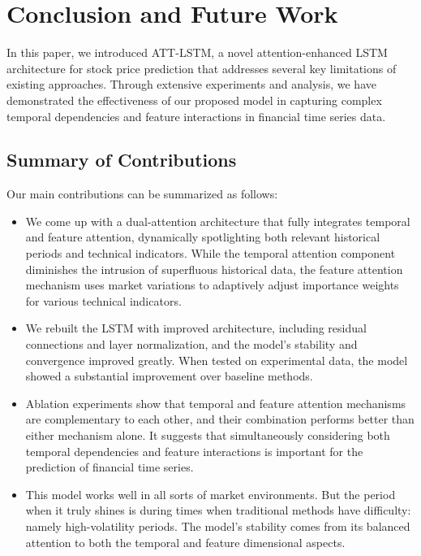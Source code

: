 \documentclass[10pt,twocolumn,letterpaper]{article}
\begin{document}
\section{Conclusion and Future Work}
In this paper, we introduced ATT-LSTM, a novel attention-enhanced LSTM architecture for stock price prediction that addresses several key limitations of existing approaches. Through extensive experiments and analysis, we have demonstrated the effectiveness of our proposed model in capturing complex temporal dependencies and feature interactions in financial time series data.
\subsection{Summary of Contributions}
Our main contributions can be summarized as follows:
\begin{itemize}
	\item We come up with a dual-attention architecture that fully integrates temporal and feature attention, dynamically spotlighting both relevant historical periods and technical indicators. While the temporal attention component diminishes the intrusion of superfluous historical data, the feature attention mechanism uses market variations to adaptively adjust importance weights for various technical indicators.
	
	\item We rebuilt the LSTM with improved architecture, including residual connections and layer normalization, and the model's stability and convergence improved greatly. When tested on experimental data, the model showed a substantial improvement over baseline methods. 
	
	\item Ablation experiments show that temporal and feature attention mechanisms are complementary to each other, and their combination performs better than either mechanism alone. It suggests that simultaneously considering both temporal dependencies and feature interactions is important for the prediction of financial time series.
	
	\item This model works well in all sorts of market environments. But the period when it truly shines is during times when traditional methods have difficulty: namely high-volatility periods. The model's stability comes from its balanced attention to both the temporal and feature dimensional aspects.
\end{itemize}
\end{document}

